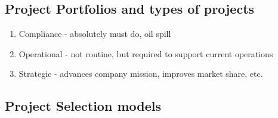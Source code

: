 \documentclass[8pt, letter]{extarticle}
\begin{document}
\begin{multicols}{2}
    \subsection{Project Portfolios and types of projects}
    \begin{enumerate}
        \item Compliance - absolutely must do, oil spill
        \item Operational - not routine, but required to support current operations
        \item Strategic - advances company mission, improves market share, etc.
    \end{enumerate}

    \subsection{Project Selection models}

\end{multicols}
\end{document}

